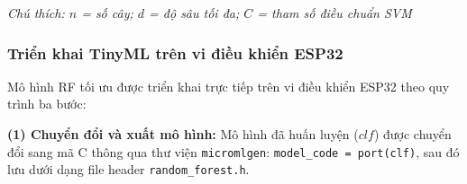 \begin{table}[!htb]
    \caption{Cấu hình tham số tối ưu các mô hình nhận dạng trên tập dữ liệu riêng}
    \label{tab:model_config}
    \centering
    \footnotesize
    \renewcommand{\arraystretch}{1.2}
    \footnotesize \textit{Chú thích: $n$ = số cây; $d$ = độ sâu tối đa; $C$ = tham số điều chuẩn SVM}
\end{table}

\subsubsection{Triển khai TinyML trên vi điều khiển ESP32}

Mô hình RF tối ưu được triển khai trực tiếp trên vi điều khiển ESP32 theo quy trình ba bước:

\textbf{(1) Chuyển đổi và xuất mô hình:} Mô hình đã huấn luyện ($clf$) được chuyển đổi sang mã C thông qua thư viện \texttt{micromlgen}: \texttt{model\_code = port(clf)}, sau đó lưu dưới dạng file header \texttt{random\_forest.h}.

